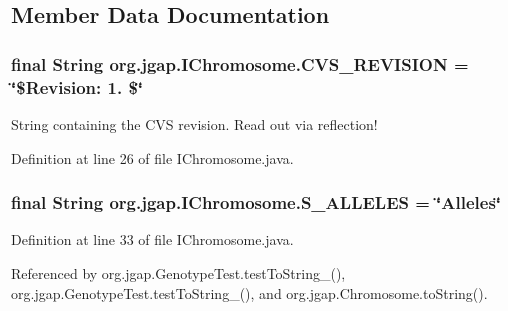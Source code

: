 \subsection{Member Data Documentation}
\hypertarget{interfaceorg_1_1jgap_1_1_i_chromosome_a4e7381b89963f2ee6f69839b38ea8dab}{
\subsubsection[{C\-V\-S\-\_\-\-R\-E\-V\-I\-S\-I\-O\-N}]{\setlength{\rightskip}{0pt plus 5cm}final String org.\-jgap.\-I\-Chromosome.\-C\-V\-S\-\_\-\-R\-E\-V\-I\-S\-I\-O\-N = \char`\"{}\$Revision\-: 1. \$\char`\"{}\hspace{0.3cm}{\ttfamily [static]}}}\label{interfaceorg_1_1jgap_1_1_i_chromosome_a4e7381b89963f2ee6f69839b38ea8dab}
String containing the C\-V\-S revision. Read out via reflection! 

Definition at line 26 of file I\-Chromosome.\-java.

\hypertarget{interfaceorg_1_1jgap_1_1_i_chromosome_ae93666d5923e449f45656ad5fed52f84}{
\subsubsection[{S\-\_\-\-A\-L\-L\-E\-L\-E\-S}]{\setlength{\rightskip}{0pt plus 5cm}final String org.\-jgap.\-I\-Chromosome.\-S\-\_\-\-A\-L\-L\-E\-L\-E\-S = \char`\"{}Alleles\char`\"{}\hspace{0.3cm}{\ttfamily [static]}}}\label{interfaceorg_1_1jgap_1_1_i_chromosome_ae93666d5923e449f45656ad5fed52f84}


Definition at line 33 of file I\-Chromosome.\-java.



Referenced by org.\-jgap.\-Genotype\-Test.\-test\-To\-String\-\_(), org.\-jgap.\-Genotype\-Test.\-test\-To\-String\-\_(), and org.\-jgap.\-Chromosome.\-to\-String().

